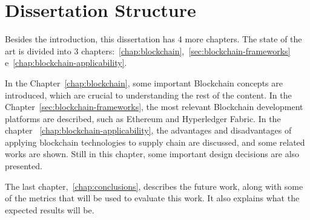 \section{Dissertation Structure} \label{sec:struct}

Besides the introduction, this dissertation has 4 more chapters. The state of the art is divided into 3 chapters:~\ref{chap:blockchain},~\ref{sec:blockchain-frameworks} e~\ref{chap:blockchain-applicability}.

In the Chapter~\ref{chap:blockchain}, some important Blockchain concepts are introduced, which are crucial to understanding the rest of the content. In the Chapter~\ref{sec:blockchain-frameworks}, the most relevant Blockchain development platforms are described, such as Ethereum and Hyperledger Fabric. In the chapter ~\ref{chap:blockchain-applicability}, the advantages and disadvantages of applying blockchain technologies to supply chain are discussed, and some related works are shown. Still in this chapter, some important design decisions are also presented.

The last chapter,~\ref{chap:conclusions}, describes the future work, along with some of the metrics that will be used to evaluate this work. It also explains what the expected results will be.

